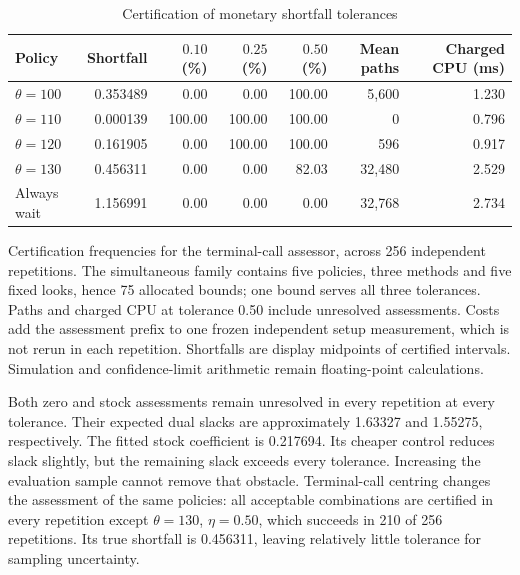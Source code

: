 \documentclass[11pt]{article}
\begin{document}
\begin{table}[!htbp]
\centering\small
\caption{Certification of monetary shortfall tolerances}\label{tab:revision-decision}
\begin{tabular}{@{}lrrrrrr@{}}
\toprule
Policy & Shortfall & $0.10$ (\%) & $0.25$ (\%) & $0.50$ (\%) & Mean paths & Charged CPU (ms) \\
\midrule
$\theta=100$ & 0.353489 & 0.00 & 0.00 & 100.00 & 5,600 & 1.230 \\
$\theta=110$ & 0.000139 & 100.00 & 100.00 & 100.00 & 0 & 0.796 \\
$\theta=120$ & 0.161905 & 0.00 & 100.00 & 100.00 & 596 & 0.917 \\
$\theta=130$ & 0.456311 & 0.00 & 0.00 & 82.03 & 32,480 & 2.529 \\
Always wait & 1.156991 & 0.00 & 0.00 & 0.00 & 32,768 & 2.734 \\
\bottomrule
\end{tabular}
\par\smallskip\begin{minipage}{\textwidth}\footnotesize Certification frequencies for the terminal-call assessor, across 256 independent repetitions. The simultaneous family contains five policies, three methods and five fixed looks, hence 75 allocated bounds; one bound serves all three tolerances. Paths and charged CPU at tolerance 0.50 include unresolved assessments. Costs add the assessment prefix to one frozen independent setup measurement, which is not rerun in each repetition. Shortfalls are display midpoints of certified intervals. Simulation and confidence-limit arithmetic remain floating-point calculations.\end{minipage}
\end{table}

Both zero and stock assessments remain unresolved in every repetition at every tolerance. Their expected dual slacks are approximately 1.63327 and 1.55275, respectively. The fitted stock coefficient is 0.217694. Its cheaper control reduces slack slightly, but the remaining slack exceeds every tolerance. Increasing the evaluation sample cannot remove that obstacle. Terminal-call centring changes the assessment of the same policies: all acceptable combinations are certified in every repetition except $\theta=130$, $\eta=0.50$, which succeeds in 210 of 256 repetitions. Its true shortfall is 0.456311, leaving relatively little tolerance for sampling uncertainty.
\end{document}
